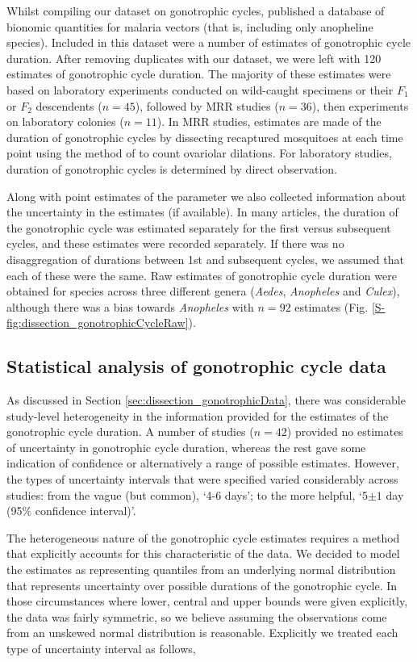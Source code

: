 \documentclass[12pt]{article}
\begin{document}
{Whilst compiling our dataset on gonotrophic cycles, \cite{massey2016global} published a database of bionomic quantities for malaria vectors (that is, including only anopheline species). Included in this dataset were a number of estimates of gonotrophic cycle duration. After removing duplicates with our dataset, we were left with 120 estimates of gonotrophic cycle duration. The majority of these estimates were based on laboratory experiments conducted on wild-caught specimens or their $F_1$ or $F_2$ descendents ($n=45$), followed by MRR studies ($n=36$), then experiments on laboratory colonies ($n=11$). In MRR studies, estimates are made of the duration of gonotrophic cycles by dissecting recaptured mosquitoes at each time point using the method of \cite{polovodova1949determination} to count ovariolar dilations. For laboratory studies, duration of gonotrophic cycles is determined by direct observation.

Along with point estimates of the parameter we also collected information about the uncertainty in the estimates (if available). In many articles, the duration of the gonotrophic cycle was estimated separately for the first versus subsequent cycles, and these estimates were recorded separately. If there was no disaggregation of durations between 1st and subsequent cycles, we assumed that each of these were the same. Raw estimates of gonotrophic cycle duration were obtained for species across three different genera (\textit{Aedes}, \textit{Anopheles} and \textit{Culex}), although there was a bias towards \textit{Anopheles} with $n=92$ estimates (Fig. \ref{S-fig:dissection_gonotrophicCycleRaw}).

\subsection{Statistical analysis of gonotrophic cycle data}\label{sec:dissection_gonotrophicMethod}
As discussed in Section \ref{sec:dissection_gonotrophicData}, there was considerable study-level heterogeneity in the information provided for the estimates of the gonotrophic cycle duration. A number of studies ($n=42$) provided no estimates of uncertainty in gonotrophic cycle duration, whereas the rest gave some indication of confidence or alternatively a range of possible estimates. However, the types of uncertainty intervals that were specified varied considerably across studies: from the vague (but common), `4-6 days'; to the more helpful, `5$\pm 1$ day (95\% confidence interval)'. 

The heterogeneous nature of the gonotrophic cycle estimates requires a method that explicitly accounts for this characteristic of the data. We decided to model the estimates as representing quantiles from an underlying normal distribution that represents uncertainty over possible durations of the gonotrophic cycle. In those circumstances where lower, central and upper bounds were given explicitly, the data was fairly symmetric, so we believe assuming the observations come from an unskewed normal distribution is reasonable. Explicitly we treated each type of uncertainty interval as follows,

}
\end{document}
